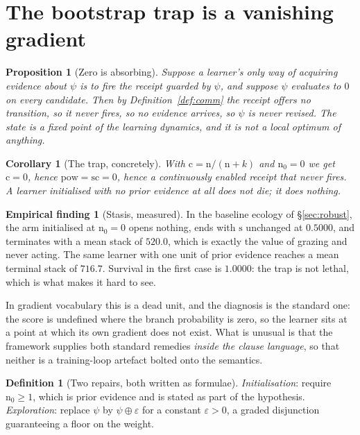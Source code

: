 \documentclass[11pt,a4paper]{article}
\theoremstyle{plain}
\newtheorem{proposition}[theorem]{Proposition}
\newtheorem{corollary}[theorem]{Corollary}
\theoremstyle{definition}
\newtheorem{definition}[theorem]{Definition}
\newtheorem{finding}[theorem]{Empirical finding}
\theoremstyle{remark}
\newcommand{\sumv}{\oplus}
\newcommand{\pow}{\mathrm{pow}}
\newcommand{\str}{\mathrm{s}}
\newcommand{\conf}{\mathrm{c}}
\newcommand{\ev}{\mathrm{n}}
\begin{document}
\section{The bootstrap trap is a vanishing gradient}\label{sec:bootstrap}

\begin{proposition}[Zero is absorbing]\label{prop:zero}
Suppose a learner's only way of acquiring evidence about $\psi$ is to fire the
receipt guarded by $\psi$, and suppose $\psi$ evaluates to $0$ on every
candidate. Then by Definition~\ref{def:comm} the receipt offers no transition, so
it never fires, so no evidence arrives, so $\psi$ is never revised. The state is
a fixed point of the learning dynamics, and it is not a local optimum of
anything.
\end{proposition}

\begin{corollary}[The trap, concretely]\label{cor:trap}
With $\conf = \ev/(\ev+k)$ and $\ev_0 = 0$ we get $\conf = 0$, hence
$\pow = \str\conf = 0$, hence a continuously enabled receipt that never fires.
A learner initialised with no prior evidence at all does not die; it does
nothing.
\end{corollary}

\begin{finding}[Stasis, measured]\label{find:trap}
In the baseline ecology of \S\ref{sec:robust}, the arm initialised at $\ev_0=0$
opens nothing, ends with $\str$ unchanged at $0.5000$, and terminates with a mean
stack of $520.0$, which is exactly the value of grazing and never acting. The
same learner with one unit of prior evidence reaches a mean terminal stack of
$716.7$. Survival in the first case is $1.0000$: the trap is not lethal, which is
what makes it hard to see.
\end{finding}

In gradient vocabulary this is a dead unit, and the diagnosis is the standard
one: the score is undefined where the branch probability is zero, so the learner
sits at a point at which its own gradient does not exist. What is unusual is that
the framework supplies both standard remedies \emph{inside the clause language},
so that neither is a training-loop artefact bolted onto the semantics.

\begin{definition}[Two repairs, both written as formulae]\label{def:repairs}
\emph{Initialisation}: require $\ev_0 \ge 1$, which is prior evidence and is
stated as part of the hypothesis.
\emph{Exploration}: replace $\psi$ by $\psi \sumv \varepsilon$ for a constant
$\varepsilon > 0$, a graded disjunction guaranteeing a floor on the weight.
\end{definition}
\end{document}
